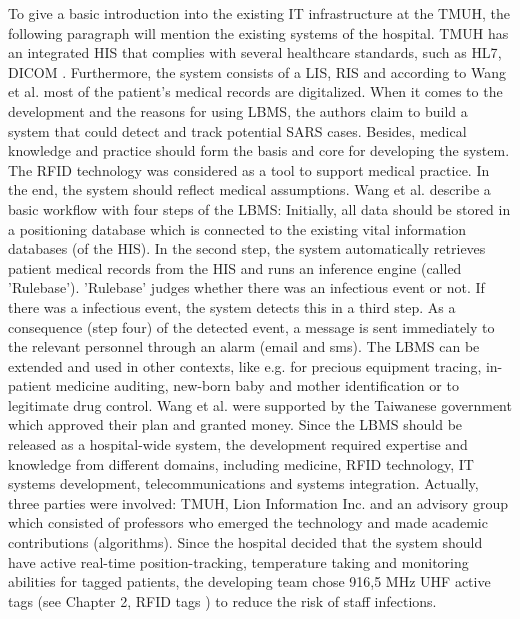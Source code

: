 To give a basic introduction into the existing IT infrastructure at the TMUH, the following paragraph will mention the existing systems of the hospital. TMUH has an integrated HIS that complies with several healthcare standards, such as \ac{HL7}, \ac{DICOM} \cite[p.3 ff.]{casestudy}. Furthermore, the system consists of a LIS, RIS and according to Wang et al. most of the patient's medical records are digitalized. When it comes to the development and the reasons for using LBMS, the authors claim to build a system that could detect and track potential SARS cases. Besides, medical knowledge and practice should form the basis and core for developing the system. The RFID technology was considered as a tool to support medical practice. In the end, the system should reflect medical assumptions. 
Wang et al. describe a basic workflow with four steps of the LBMS: Initially, all data should be stored in a positioning database which is connected to the existing vital information databases (of the HIS). In the second step, the system automatically retrieves patient medical records from the HIS and runs an inference engine (called 'Rulebase').  'Rulebase' judges whether there was an infectious event or not. If there was a infectious event, the system detects this in a third step. As a consequence (step four) of the detected event, a message is sent immediately to the relevant personnel through an alarm (email and sms). 
The LBMS can be extended and used in other contexts, like e.g. for precious equipment tracing, in-patient medicine auditing, new-born baby and mother identification or to legitimate drug control.
Wang et al. were supported by the Taiwanese government which approved their plan and granted money. Since the LBMS should be released as a hospital-wide system, the development required expertise and knowledge from different domains, including medicine, RFID technology, IT systems development, telecommunications and systems integration. Actually, three parties were involved: TMUH, Lion Information Inc. and an advisory group \cite[p.4]{casestudy} which consisted of professors who emerged the technology and made academic contributions (algorithms).
Since the hospital decided that the system should have active real-time position-tracking, temperature taking and monitoring abilities for tagged patients, the developing team chose 916,5 MHz UHF active tags (see Chapter 2, RFID tags \pageref{tag}) to reduce the risk of staff infections.

